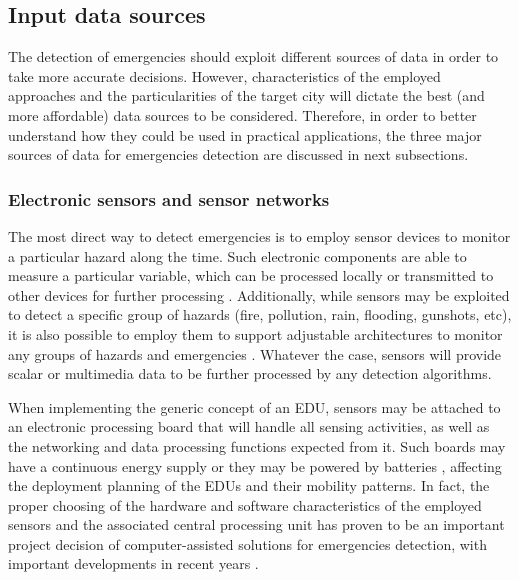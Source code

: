 \begin{refsection}
\subsection{Input data sources}

The detection of emergencies should exploit different sources of data in order to take more accurate decisions. However, characteristics of the employed approaches and the particularities of the target city will dictate the best (and more affordable) data sources to be considered. Therefore, in order to better understand how they could be used in practical applications, the three major sources of data for emergencies detection are discussed in next subsections.

\subsubsection{Electronic sensors and sensor networks}

The most direct way to detect emergencies is to employ sensor devices to monitor a particular hazard along the time. Such electronic components are able to measure a particular variable, which can be processed locally \cite{edge1} or transmitted to other devices for further processing \cite{iotRain1}. Additionally, while sensors may be exploited to detect a specific group of hazards (fire, pollution, rain, flooding, gunshots, etc), it is also possible to employ them to support adjustable architectures to monitor any groups of hazards and emergencies \cite{emergenciesmetric2,emergenciesmetric4,emergenciesmetric6,emergenciesmetric5}. Whatever the case, sensors will provide scalar or multimedia data to be further processed by any detection algorithms.

When implementing the generic concept of an EDU, sensors may be attached to an electronic processing board that will handle all sensing activities, as well as the networking and data processing functions expected from it. Such boards may have a continuous energy supply or they may be powered by batteries \cite{energy1}, affecting the deployment planning of the EDUs and their mobility patterns. In fact, the proper choosing of the hardware and software characteristics of the employed sensors and the associated central processing unit has proven to be an important project decision of computer-assisted solutions for emergencies detection, with important developments in recent years \cite{sensorsplatforms,sensorsplatforms2,sensorsplatforms3}.


\end{refsection}
